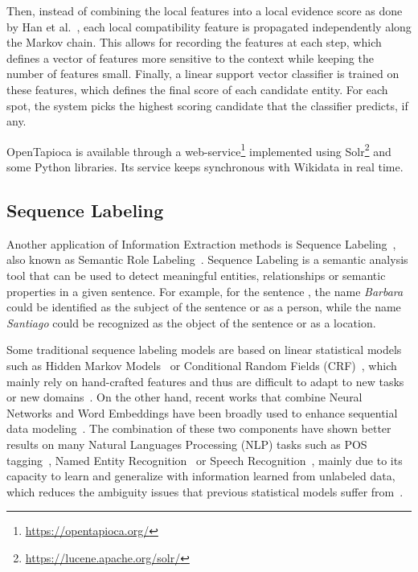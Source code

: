 Then, instead of combining the local features into a local evidence score as done by 
Han et al.~\cite{infExtr:HanSZ11}, each local compatibility feature is propagated 
independently along the Markov chain. This allows for recording the features at each step, 
which defines a vector of features more sensitive to the context while keeping the number of 
features small. Finally, a linear support vector classifier is trained on these features, 
which defines the final score of each candidate entity. For each spot, the system picks the 
highest scoring candidate that the classifier predicts, if any.

OpenTapioca is available through a web-service\footnote{\url{https://opentapioca.org/}} 
implemented using Solr\footnote{\url{https://lucene.apache.org/solr/}} and some Python libraries. 
Its service keeps synchronous with Wikidata in real time.

\subsection{Sequence Labeling}
\label{cap2:theoFrame/infExtr/sequenceLabeling}
Another application of Information Extraction methods is Sequence Labeling~\cite{seqlab:Graves2012-385, seqlab:MaH16}, 
also known as Semantic Role Labeling~\cite{seqlab:GildeaJ02}. Sequence Labeling is a 
semantic analysis tool that can be used to detect meaningful entities, relationships or 
semantic properties in a given sentence. For example, for the sentence , the name \textit{Barbara} could be identified as the subject of the sentence 
or as a person, while the name \textit{Santiago} could be recognized as the object of the 
sentence or as a location.

Some traditional sequence labeling models are based on linear statistical models such as 
Hidden Markov Models~\cite{seqlab:RatinovR09} or Conditional Random 
Fields (CRF)~\cite{seqlab:PassosKM14, seqlab:LuoHLN15}, which mainly rely on hand-crafted 
features and thus are difficult to adapt to new tasks or new domains~\cite{seqlab:MaX14}. 
On the other hand, recent works that combine Neural Networks and Word Embeddings have been 
broadly used to enhance sequential data modeling~\cite{seqlab:ChoMBB14, seqlab:GersSC00}. 
The combination of these two components have shown better results on many Natural 
Languages Processing (NLP) tasks such as POS tagging~\cite{seqlab:MaH16,seqlab:HuangXY15}, 
Named Entity Recognition~\cite{seqlab:ChiuN15,seqlab:HuMLHX16} or Speech 
Recognition~\cite{seqlab:GravesMH13}, mainly due to its capacity to learn and generalize 
with information learned from unlabeled data, which reduces the ambiguity issues that 
previous statistical models suffer from~\cite{seqlab:MaX14}.

